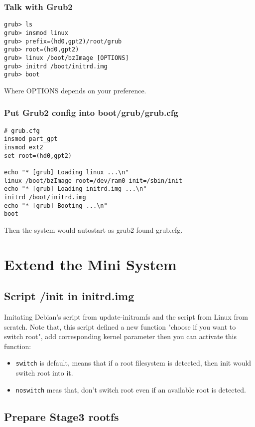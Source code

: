 \documentclass[10pt,a4paper]{article}
\begin{document}
\subsubsection{Talk with Grub2}
\begin{framed}\begin{verbatim}
grub> ls
grub> insmod linux
grub> prefix=(hd0,gpt2)/root/grub
grub> root=(hd0,gpt2)
grub> linux /boot/bzImage [OPTIONS]
grub> initrd /boot/initrd.img
grub> boot
\end{verbatim}\end{framed}
Where OPTIONS depends on your preference.
\subsubsection{Put Grub2 config into boot/grub/grub.cfg}
\begin{framed}\begin{verbatim}
# grub.cfg
insmod part_gpt
insmod ext2
set root=(hd0,gpt2)

echo "* [grub] Loading linux ...\n"
linux /boot/bzImage root=/dev/ram0 init=/sbin/init
echo "* [grub] Loading initrd.img ...\n"
initrd /boot/initrd.img
echo "* [grub] Booting ...\n"
boot
\end{verbatim}\end{framed}
Then the system would autostart as grub2 found grub.cfg.

\section{Extend the Mini System}
\subsection{Script /init in initrd.img}
Imitating Debian's script from update-initramfs and the script from Linux from scratch\cite{bib:lfs}.\newline
Note that, this script defined a new function "choose if you want to switch root", add corresponding
kernel parameter then you can activate this function:
\begin{itemize}
\item \texttt{switch} is default, means that if a root filesystem is detected, then init would switch root into it.
\item \texttt{noswitch} meas that, don't switch root even if an available root is detected.
\end{itemize}


\subsection{Prepare Stage3 rootfs}
\end{document}
